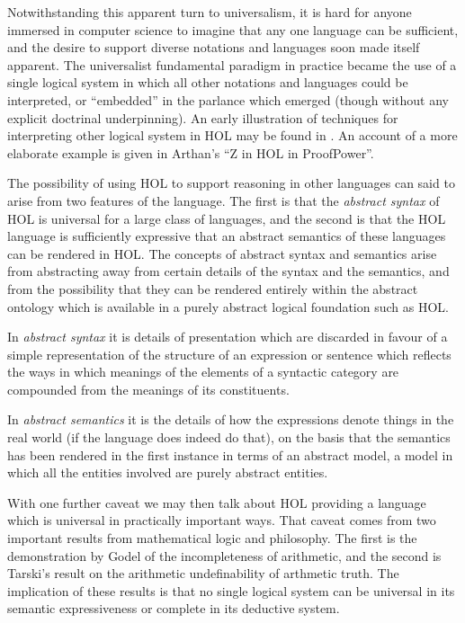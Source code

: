 \documentclass[10pt,titlepage]{book}
\begin{document}
Notwithstanding this apparent turn to universalism, it is hard for anyone immersed in computer science to imagine that any one language can be sufficient, and the desire to support diverse notations and languages soon made itself apparent.
The universalist fundamental paradigm in practice became the use of a single logical system in which all other notations and languages could be interpreted, or ``embedded'' in the parlance which emerged (though without any explicit doctrinal underpinning).
An early illustration of techniques for interpreting other logical system in HOL may be found in \cite{gordon1989mechanizing}.
An account of a more elaborate example is given in Arthan's ``Z in HOL in ProofPower''\cite{arthan2005}.

The possibility of using HOL to support reasoning in other languages can said to arise from two features of the language.
The first is that the \emph{abstract syntax} of HOL is universal for a large class of languages, and the second is that the HOL language is sufficiently expressive that an abstract semantics of these languages can be rendered in HOL.
The concepts of abstract syntax and semantics arise from abstracting away from certain details of the syntax and the semantics, and from the possibility that they can be rendered entirely within the abstract ontology which is available in a purely abstract logical foundation such as HOL.

In \emph{abstract syntax} it is details of presentation which are discarded in favour of a simple representation of the structure of an expression or sentence which reflects the ways in which meanings of the elements of a syntactic category are compounded from the meanings of its constituents.

In \emph{abstract semantics} it is the details of how the expressions denote things in the real world (if the language does indeed do that), on the basis that the semantics has been rendered in the first instance in terms of an abstract model, a model in which all the entities involved are purely abstract entities.

With one further caveat we may then talk about HOL providing a language which is universal in practically important ways.
That caveat comes from two important results from mathematical logic and philosophy.
The first is the demonstration by Godel\cite{godel31a} of the incompleteness of arithmetic, and the second is Tarski's result on the arithmetic undefinability of arthmetic truth\cite{tarski31}.
The implication of these results is that no single logical system can be universal in its semantic expressiveness or complete in its deductive system.
\end{document}
